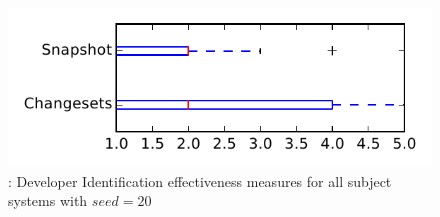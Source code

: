 
\begin{figure}
\centering
\includegraphics[height=0.4\textheight]{figures/dit_seed/rq1_tiny_20}
\caption{\rtwo: Developer Identification effectiveness measures for all subject systems with $seed=20$}
\label{fig:dit_seed:rq1:tiny}
\end{figure}

